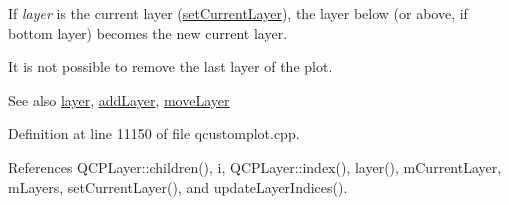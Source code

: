 If {\itshape layer} is the current layer (\hyperlink{class_q_custom_plot_a73a6dc47c653bb6f8f030abca5a11852}{set\+Current\+Layer}), the layer below (or above, if bottom layer) becomes the new current layer.

It is not possible to remove the last layer of the plot.

\begin{DoxySeeAlso}{See also}
\hyperlink{class_q_custom_plot_aac492da01782820454e9136a8db28182}{layer}, \hyperlink{class_q_custom_plot_ad5255393df078448bb6ac83fa5db5f52}{add\+Layer}, \hyperlink{class_q_custom_plot_ae896140beff19424e9e9e02d6e331104}{move\+Layer} 
\end{DoxySeeAlso}


Definition at line 11150 of file qcustomplot.\+cpp.



References Q\+C\+P\+Layer\+::children(), i, Q\+C\+P\+Layer\+::index(), layer(), m\+Current\+Layer, m\+Layers, set\+Current\+Layer(), and update\+Layer\+Indices().


